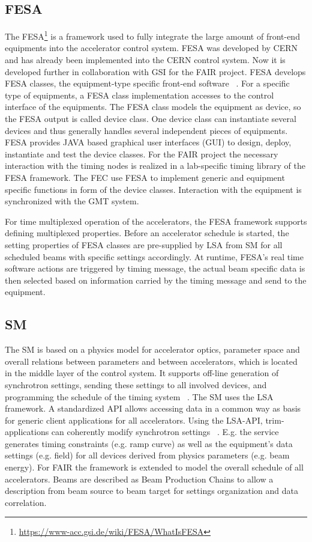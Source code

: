 \subsection{FESA}
The \gls{FESA}\footnote{\url{https://www-acc.gsi.de/wiki/FESA/WhatIsFESA}} is a framework used to fully integrate the large amount of front-end equipments into the accelerator control system. FESA was developed by CERN and has already been implemented into the \gls{CERN} control system. Now it is developed further in collaboration with GSI for the FAIR project. FESA develops FESA classes, the equipment-type specific front-end software ~\cite{hoffmann_fesafront-end_2008}. For a specific type of equipments, a FESA class implementation accesses to the control interface of the equipments. The FESA class models the equipment as device, so the FESA output is called device class. One device class can instantiate several devices and thus generally handles several independent pieces of equipments.  FESA provides JAVA based graphical user interfaces (GUI) to design, deploy, instantiate and test the device classes. For the FAIR project the necessary interaction with the timing nodes is realized in a lab-specific timing library of the FESA framework.
The FEC use FESA to implement generic and equipment specific functions in form of the device classes. Interaction with the equipment is synchronized with the GMT system. 

For time multiplexed operation of the accelerators, the FESA framework supports defining multiplexed properties. Before an accelerator schedule is started, the setting properties of FESA classes are pre-supplied by LSA from SM for all scheduled beams with specific settings accordingly. At runtime, FESA’s real time software actions are triggered by timing message, the actual beam specific data is then selected based on information carried by the timing message and send to the equipment. 

\subsection{SM}
The \gls{SM} is based on a physics model for accelerator optics, parameter space and overall relations between parameters and between accelerators, which is located in the middle layer of the control system. It supports off-line generation of synchrotron settings, sending these settings to all involved devices, and programming the schedule of the timing system ~\cite{huhmann_fair_2013}. The SM uses the LSA framework. A standardized \gls{API} allows accessing data in a common way as basis for generic client applications for all accelerators. Using the LSA-API, trim-applications can coherently modify synchrotron settings ~\cite{huhmann_fair_2013}. E.g. the service generates timing constraints (e.g. ramp curve) as well as the equipment’s data settings (e.g. field) for all devices derived from physics parameters (e.g. beam energy). For FAIR the framework is extended to model the overall schedule of all accelerators. Beams are described as Beam Production Chains to allow a description from beam source to beam target for settings organization and data correlation.


